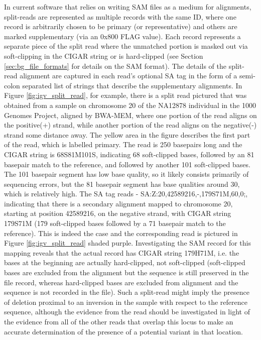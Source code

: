 In current software that relies on writing SAM files as a medium for alignments, split-reads are represented as multiple records with the same ID, where one record is arbitrarily chosen to be primary (or representative) and others are marked supplementary (via an 0x800 FLAG value). Each record represents a separate piece of the split read where the unmatched portion is masked out via soft-clipping in the CIGAR string or is hard-clipped (see Section \ref{sec:bg_file_formats} for details on the SAM format). The details of the split-read alignment are captured in each read's optional SA tag in the form of a semi-colon separated list of strings that describe the supplementary alignments. In Figure \ref{fig:igv_split_read}, for example, there is a split read pictured that was obtained from a sample on chromosome 20 of the NA12878 individual in the 1000 Genomes Project, aligned by BWA-MEM, where one portion of the read aligns on the positive(+) strand, while another portion of the read aligns on the negative(-) strand some distance away. The yellow area in the figure describes the first part of the read, which is labelled primary. The read is 250 basepairs long and the CIGAR string is 68S81M101S, indicating 68 soft-clipped bases, followed by an 81 basepair match to the reference, and followed by another 101 soft-clipped bases. The 101 basepair segment has low base quality, so it likely consists primarily of sequencing errors, but the 81 basepair segment has base qualities around 30, which is relatively high. The SA tag reads - SA:Z:20,42589216,-,179S71M,60,0;, indicating that there is a secondary alignment mapped to chromosome 20, starting at position 42589216, on the negative strand, with CIGAR string 179S71M (179 soft-clipped bases followed by a 71 basepair match to the reference). This is indeed the case and the corresponding read is pictured in Figure \ref{fig:igv_split_read} shaded purple. Investigating the SAM record for this mapping reveals that the actual record has CIGAR string 179H71M, i.e. the bases at the beginning are actually hard-clipped, not soft-clipped (soft-clipped bases are excluded from the alignment but the sequence is still preserved in the file record, whereas hard-clipped bases are excluded from alignment and the sequence is not recorded in the file). Such a split-read might imply the presence of deletion proximal to an inversion in the sample with respect to the reference sequence, although the evidence from the read should be investigated in light of the evidence from all of the other reads that overlap this locus to make an accurate determination of the presence of a potential variant in that location.

